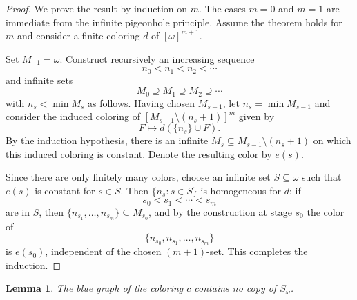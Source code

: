 \documentclass[11pt,a4paper]{amsart}
\newtheorem{lemma}[theorem]{Lemma}
\theoremstyle{definition}
\begin{document}
\begin{proof}
We prove the result by induction on $m$.  The cases $m=0$ and $m=1$ are immediate from the infinite pigeonhole principle.  Assume the theorem holds for $m$ and consider a finite coloring $d$ of $[\omega]^{m+1}$.

Set $M_{-1}=\omega$.  Construct recursively an increasing sequence
\[
        n_0<n_1<n_2<\cdots
\]
and infinite sets
\[
        M_0\supseteq M_1\supseteq M_2\supseteq\cdots
\]
with $n_s<\min M_s$ as follows.  Having chosen $M_{s-1}$, let $n_s=\min M_{s-1}$ and consider the induced coloring of $[M_{s-1}\setminus(n_s+1)]^m$ given by
\[
        F\longmapsto d(\{n_s\}\cup F).
\]
By the induction hypothesis, there is an infinite $M_s\subseteq M_{s-1}\setminus(n_s+1)$ on which this induced coloring is constant.  Denote the resulting color by $e(s)$.

Since there are only finitely many colors, choose an infinite set $S\subseteq\omega$ such that $e(s)$ is constant for $s\in S$.  Then $\{n_s:s\in S\}$ is homogeneous for $d$: if
\[
        s_0<s_1<\cdots<s_m
\]
are in $S$, then $\{n_{s_1},\dots,n_{s_m}\}\subseteq M_{s_0}$, and by the construction at stage $s_0$ the color of
\[
        \{n_{s_0},n_{s_1},\dots,n_{s_m}\}
\]
is $e(s_0)$, independent of the chosen $(m+1)$-set.  This completes the induction.
\end{proof}

\begin{lemma}\label{lem:no-blue-shift}
The blue graph of the coloring $c$ contains no copy of $S_\omega$.
\end{lemma}
\end{document}
